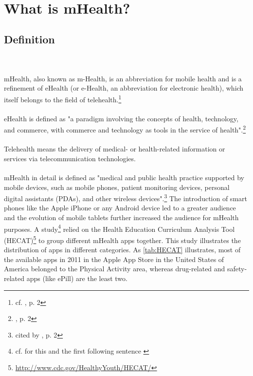 \section{What is mHealth?}

\subsection{Definition}
\\
\\
mHealth, also known as m-Health, is an abbreviation for mobile health and is a refinement of eHealth (or e-Health, an abbreviation for electronic health), which itself belongs to the field of telehealth.\footnote{cf. \cite{MartinezPerez.2013}, p. 2}
\\
\\
eHealth is defined as "a paradigm involving the concepts of health, technology, and commerce, with commerce and technology as tools in the service of health".\footnote{\cite{MartinezPerez.2013}, p. 2}
\\
\\
Telehealth means the delivery of medical- or health-related information or services via telecommunication technologies.
\\
\\
mHealth in detail is defined as "medical and public health practice supported by mobile devices, such as mobile phones, patient monitoring devices, personal digital assistants (PDAs), and other wireless devices".\footnote{\cite{WorldHealthOrganization.2011} cited by \cite{MartinezPerez.2013}, p. 2} The introduction of smart phones like the Apple iPhone or any Android device led to a greater audience and the evolution of mobile tablets further increased the audience for mHealth purposes. A study\footnote{cf. for this and the first following sentence \cite{West.2012}} relied on the Health Education Curriculum Analysis Tool (HECAT)\footnote{\url{http://www.cdc.gov/HealthyYouth/HECAT/}} to group different mHealth apps together. This study illustrates the distribution of apps in different categories. As \ref{tab:HECAT} illustrates, most of the available apps in 2011 in the Apple App Store in the United States of America belonged to the Physical Activity area, whereas drug-related and safety-related apps (like ePill) are the least two. 

